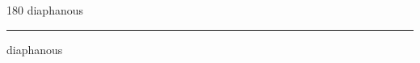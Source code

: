 
\begin{frame}
\begin{center}
\begin{turn}{180}
{\fontsize{2.5cm}{1em}\selectfont diaphanous}
\end{turn}
\vspace{1em}\par  
\hrule
\vspace{1em}\par  
{\fontsize{2.5cm}{1em}\selectfont diaphanous}
\end{center}
\end{frame}

